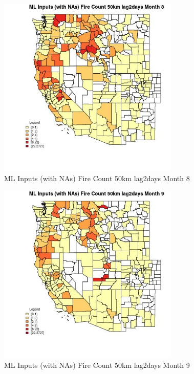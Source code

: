 \begin{figure} 
\centering  
\includegraphics[width=0.77\textwidth]{Code_Outputs/Report_ML_input_PM25_Step4_part_f_de_duplicated_aveswNAs_CountyFire_Count_50km_lag2daysmedianMonth8.jpg} 
\caption{\label{fig:Report_ML_input_PM25_Step4_part_f_de_duplicated_aveswNAsCountyFire_Count_50km_lag2daysmedianMonth8}ML Inputs (with NAs) Fire Count 50km lag2days Month 8} 
\end{figure} 
 

\begin{figure} 
\centering  
\includegraphics[width=0.77\textwidth]{Code_Outputs/Report_ML_input_PM25_Step4_part_f_de_duplicated_aveswNAs_CountyFire_Count_50km_lag2daysmedianMonth9.jpg} 
\caption{\label{fig:Report_ML_input_PM25_Step4_part_f_de_duplicated_aveswNAsCountyFire_Count_50km_lag2daysmedianMonth9}ML Inputs (with NAs) Fire Count 50km lag2days Month 9} 
\end{figure} 
 

